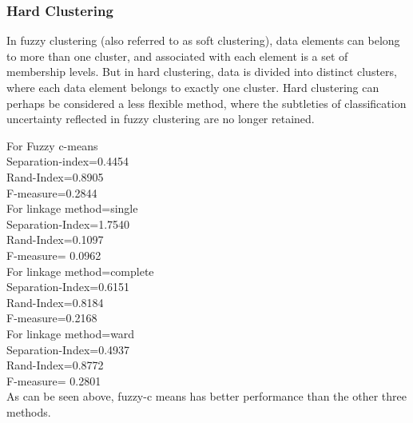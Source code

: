 \documentclass[]{article}
\begin{document}
\subsubsection{Hard Clustering}

In fuzzy clustering (also referred to as soft clustering), data elements can belong to more than one cluster, and associated with each element is a set of membership levels. But in hard clustering, data is divided into distinct clusters, where each data element belongs to exactly one cluster. Hard clustering can perhaps be considered a less flexible method, where the subtleties of classification uncertainty reflected in fuzzy clustering are no longer retained.

For Fuzzy c-means\\
Separation-index=0.4454\\
Rand-Index=0.8905\\
F-measure=0.2844\\

For linkage method=single\\
Separation-Index=1.7540 \\
Rand-Index=0.1097\\
F-measure= 0.0962\\
For linkage method=complete\\
Separation-Index=0.6151 \\
Rand-Index=0.8184 \\
F-measure=0.2168\\
For linkage method=ward\\
Separation-Index=0.4937 \\
Rand-Index=0.8772 \\
F-measure= 0.2801 \\

As can be seen above, fuzzy-c means has better performance than the other three methods.
\end{document}

